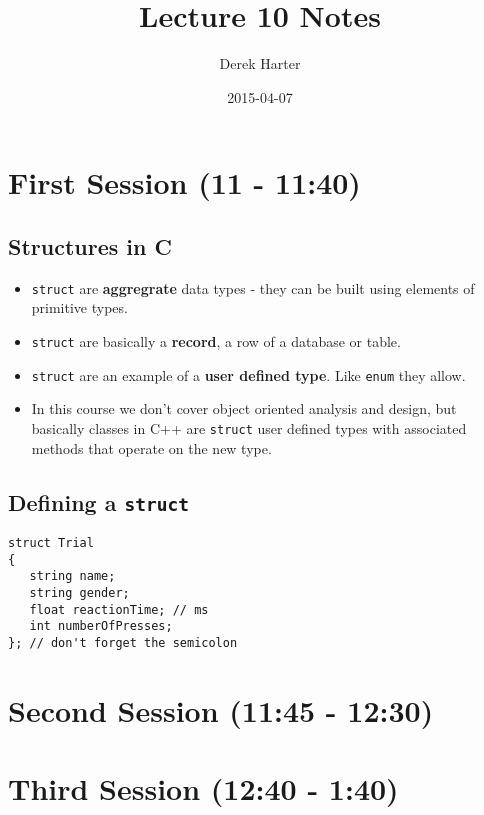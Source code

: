 \documentclass[11pt]{article}
\title{Lecture 10 Notes}
\author{Derek Harter}
\date{2015-04-07}
\begin{document}
\maketitle


\section{First Session (11 - 11:40)}
\label{sec-1}
\subsection{Structures in C}
\label{sec-1-1}


\begin{itemize}
\item \verb~struct~ are \textbf{aggregrate} data types - they can be built using
  elements of primitive types.
\item \verb~struct~ are basically a \textbf{record}, a row of a database or table.
\item \verb~struct~ are an example of a \textbf{user defined type}.  Like \verb~enum~ they
  allow.
\item In this course we don't cover object oriented analysis and design,
  but basically classes in C++ are \verb~struct~ user defined types with
  associated methods that operate on the new type.
\end{itemize}
\subsection{Defining a \verb~struct~}
\label{sec-1-2}



\begin{verbatim}
struct Trial
{
   string name;
   string gender;
   float reactionTime; // ms
   int numberOfPresses;
}; // don't forget the semicolon
\end{verbatim}
\section{Second Session (11:45 - 12:30)}
\label{sec-2}
\subsection{}
\section{Third Session (12:40 - 1:40)}
\label{sec-3}
\end{document}
